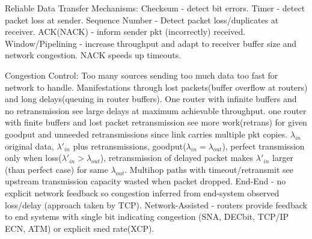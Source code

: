 \documentclass[9pt]{extarticle}
\begin{document}
\begin{multicols}{2}
Reliable Data Transfer Mechanisms: Checksum - detect bit errors. Timer - detect packet loss at sender. Sequence Number - Detect packet loss/duplicates at receiver. ACK(NACK) - inform sender pkt (incorrectly) received. Window/Pipelining - increase throughput and adapt to receiver buffer size and network congestion. NACK speeds up timeouts.

Congestion Control: Too many sources sending too much data too fast for network to handle. Manifestations through lost packets(buffer overflow at routers) and long delays(queuing in router buffers). One router with infinite buffers and no retransmission see large delays at maximum achievable throughput. one router with finite buffers and lost packet retransmission see more work(retrans) for given goodput and unneeded retransmissions since link carries multiple pkt copies. $\lambda_{in}$ original data, $\lambda'_{in}$ plus retransmissions, goodput($\lambda_{in}=\lambda_{out}$), perfect transmission only when loss($\lambda'_{in}>\lambda_{out}$), retransmission of delayed packet makes $\lambda'_{in}$ larger (than perfect case) for same $\lambda_{out}$. Multihop paths with timeout/retransmit see upstream transmission capacity wasted when packet dropped. End-End - no explicit network feedback so congestion inferred from end-system observed loss/delay (approach taken by TCP). Network-Assisted - routers provide feedback to end systems with single bit indicating congestion (SNA, DECbit, TCP/IP ECN, ATM) or explicit sned rate(XCP).


\end{multicols}
\end{document}
